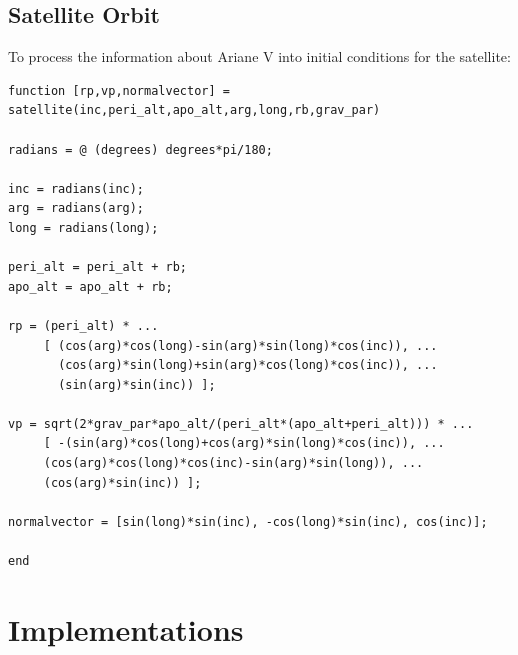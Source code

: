 \documentclass{article}
\begin{document}
\subsection{Satellite Orbit}\label{sec:satorb}
To process the information about Ariane V into initial conditions for
the satellite:
\begin{verbatim}
function [rp,vp,normalvector] = satellite(inc,peri_alt,apo_alt,arg,long,rb,grav_par)

radians = @ (degrees) degrees*pi/180;

inc = radians(inc);
arg = radians(arg);
long = radians(long);

peri_alt = peri_alt + rb;
apo_alt = apo_alt + rb;

rp = (peri_alt) * ...
     [ (cos(arg)*cos(long)-sin(arg)*sin(long)*cos(inc)), ...
       (cos(arg)*sin(long)+sin(arg)*cos(long)*cos(inc)), ...
       (sin(arg)*sin(inc)) ];

vp = sqrt(2*grav_par*apo_alt/(peri_alt*(apo_alt+peri_alt))) * ...
     [ -(sin(arg)*cos(long)+cos(arg)*sin(long)*cos(inc)), ...
     (cos(arg)*cos(long)*cos(inc)-sin(arg)*sin(long)), ...
     (cos(arg)*sin(inc)) ];

normalvector = [sin(long)*sin(inc), -cos(long)*sin(inc), cos(inc)];

end
\end{verbatim}

\section{Implementations}\label{sec:events}
\end{document}
